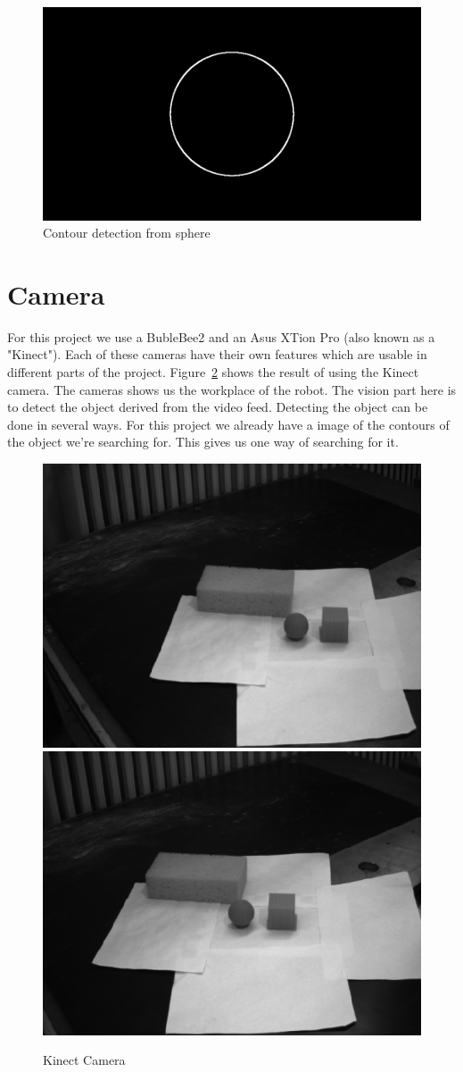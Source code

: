 \documentclass{report}
\begin{document}
\begin{figure}[h!]
\center
\includegraphics[width=.5\textwidth]{../images/contour_sphere.png}
\caption[]{Contour detection from sphere}
\label{fig:SphereContour}
\end{figure}

\section{Camera}
For this project we use a BubleBee2 and an Asus XTion Pro (also known as a "Kinect"). Each of these cameras have their own features which are usable in different parts of the project. Figure~\ref{fig:camera} shows the result of using the Kinect camera. The cameras shows us the workplace of the robot. The vision part here is to detect the object derived from the video feed. Detecting the object can be done in several ways. For this project we already have a image of the contours of the object we're searching for. This gives us one way of searching for it.

\begin{figure}[h!]
\center
\includegraphics[width=.4\textwidth]{../images/camera_left.png}
\includegraphics[width=.4\textwidth]{../images/camera_right.png}
\caption[]{Kinect Camera}
\label{fig:camera}
\end{figure}
\end{document}
